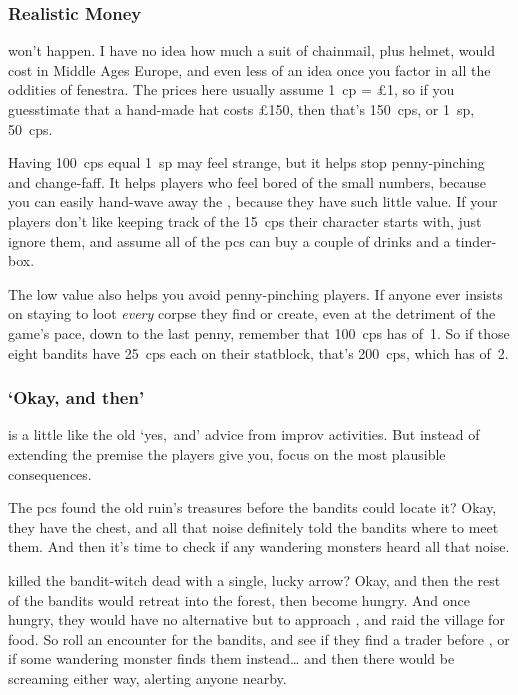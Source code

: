\begin{multicols}{2}
\subsubsection{Realistic Money}
won't happen.
I have no idea how much a suit of chainmail, plus helmet, would cost in Middle Ages Europe, and even less of an idea once you factor in all the oddities of \gls{fenestra}.
The prices here usually assume 1~\gls{cp} = \pounds1, so if you guesstimate that a hand-made hat costs \pounds150, then that's 150~\glspl{cp}, or 1~\gls{sp}, 50~\glspl{cp}.

Having 100~\glspl{cp} equal 1~\gls{sp} may feel strange, but it helps stop penny-pinching and change-faff.
It helps players who feel bored of the small numbers, because you can easily hand-wave away the , because they have such little value.
If your players don't like keeping track of the 15~\glspl{cp} their character starts with, just ignore them, and assume all of the \glspl{pc} can buy a couple of drinks and a tinder-box.

The low value also helps you avoid penny-pinching players.
If anyone ever insists on staying to loot \emph{every} corpse they find or create, even at the detriment of the game's pace, down to the last penny, remember that 100~\glspl{cp} has  of~1.
So if those eight bandits have 25~\glspl{cp} each on their statblock, that's 200~\glspl{cp}, which has  of~2.

\subsubsection{`Okay, and then'}
is a little like the old `yes,~and' advice from improv activities.
But instead of extending the premise the players give you, focus on the most plausible consequences.

The \glspl{pc} found the old ruin's treasures before the bandits could locate it?
Okay, they have the chest, and all that noise definitely told the bandits where to meet them.
And then it's time to check if any wandering \glspl{monster} heard all that noise.

 killed the bandit-\gls{witch} dead with a single, lucky arrow?
Okay, and then the rest of the bandits would retreat into the forest, then become hungry.
And once hungry, they would have no alternative but to approach , and raid the \gls{village} for food.
So roll an encounter for the bandits, and see if they find a trader before , or if some wandering \gls{monster} finds them instead\ldots
and then there would be screaming either way, alerting anyone nearby.


\end{multicols}
